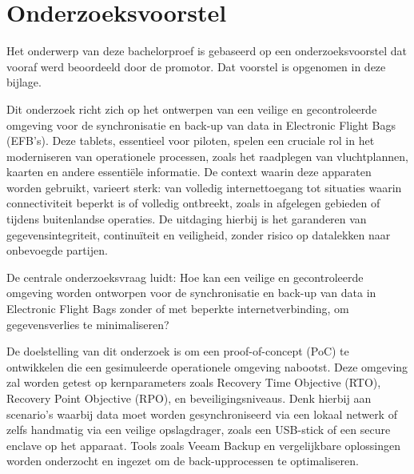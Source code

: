 \documentclass[dutch,dit,thesis]{hogentreport}
\begin{document}







%
%





\appendix

\chapter{Onderzoeksvoorstel}

Het onderwerp van deze bachelorproef is gebaseerd op een onderzoeksvoorstel dat vooraf werd beoordeeld door de promotor. Dat voorstel is opgenomen in deze bijlage.



Dit onderzoek richt zich op het ontwerpen van een veilige en gecontroleerde omgeving voor de synchronisatie en back-up van data in Electronic Flight Bags (EFB's). Deze tablets, essentieel voor piloten, spelen een cruciale rol in het moderniseren van operationele processen, zoals het raadplegen van vluchtplannen, kaarten en andere essentiële informatie. De context waarin deze apparaten worden gebruikt, varieert sterk: van volledig internettoegang tot situaties waarin connectiviteit beperkt is of volledig ontbreekt, zoals in afgelegen gebieden of tijdens buitenlandse operaties. De uitdaging hierbij is het garanderen van gegevensintegriteit, continuïteit en veiligheid, zonder risico op datalekken naar onbevoegde partijen.

De centrale onderzoeksvraag luidt: Hoe kan een veilige en gecontroleerde omgeving worden ontworpen voor de synchronisatie en back-up van data in Electronic Flight Bags zonder of met beperkte internetverbinding, om gegevensverlies te minimaliseren?

De doelstelling van dit onderzoek is om een proof-of-concept (PoC) te ontwikkelen die een gesimuleerde operationele omgeving nabootst. Deze omgeving zal worden getest op kernparameters zoals Recovery Time Objective (RTO), Recovery Point Objective (RPO), en beveiligingsniveaus. Denk hierbij aan scenario's waarbij data moet worden gesynchroniseerd via een lokaal netwerk of zelfs handmatig via een veilige opslagdrager, zoals een USB-stick of een secure enclave op het apparaat. Tools zoals Veeam Backup en vergelijkbare oplossingen worden onderzocht en ingezet om de back-upprocessen te optimaliseren.
\end{document}
